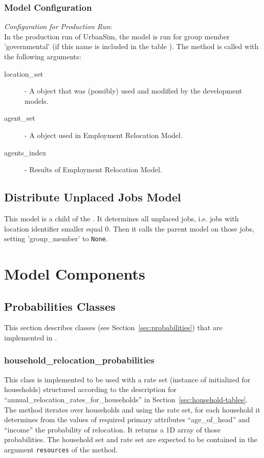\subsubsection{Model Configuration}
\modelsindex
%
{\em Configuration for Production Run}:\\[1mm]
In the production run of UrbanSim, the model is run for group member 'governmental' (if this name is included
in the table ).
The  method is called with
the following arguments:
\begin{description}
\item[location_set] - A  object that was (possibly) used
  and modified by the development models. \modelsindex
\item[agent_set] - A  object used in Employment Relocation
  Model. \modelsindex
\item[agents_index] - Results of Employment Relocation Model. \modelsindex
\end{description}


\subsection{Distribute Unplaced Jobs Model}
\modelsindex
%
\label{sec:distribute-unplaced-jobs-model} 
%
This model is a child of the . It determines all unplaced jobs, i.e.
 jobs with location identifier smaller equal 0. Then it calls the parent model on those jobs, setting 
 'group_member' to \verb|None|.

\section{Model Components}
\modelsindex
%
\label{sec:urbansim-model-components}
%
\subsection{Probabilities Classes}
%
\label{sec:urbansim-probabilities}
This section describes  classes (see
Section~\ref{sec:probabilities}) that are implemented in .

\subsubsection{household_relocation_probabilities}
%
This class is implemented to be used with a rate set (instance of
 initialized for households) structured according to the
description for ``annual_relocation_rates_for_households'' in
Section~\ref{sec:household-tables}. The  method iterates over
households and using the rate set, for each household it determines from the
values of required primary attributes \primaryattributesindex ``age_of_head'' and ``income'' the
probability of relocation. It returns a 1D array of those probabilities. The
household set and rate set are expected to be contained in the argument
\verb|resources| of the  method.

